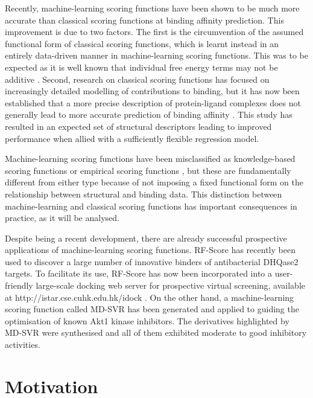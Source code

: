 Recently, machine-learning scoring functions have been shown \citep{564} to be much more accurate than classical scoring functions at binding affinity prediction. This improvement is due to two factors. The first is the circumvention of the assumed functional form of classical scoring functions, which is learnt instead in an entirely data-driven manner in machine-learning scoring functions. This was to be expected as it is well known that individual free energy terms may not be additive \citep{1471,1416}. Second, research on classical scoring functions has focused on increasingly detailed modelling of contributions to binding, but it has now been established that a more precise description of protein-ligand complexes does not generally lead to more accurate prediction of binding affinity \citep{1370}. This study has resulted in an expected set of structural descriptors leading to improved performance when allied with a sufficiently flexible regression model.

Machine-learning scoring functions have been misclassified as knowledge-based scoring functions \citep{1373,1372} or empirical scoring functions \citep{1305}, but these are fundamentally different from either type because of not imposing a fixed functional form on the relationship between structural and binding data. This distinction between machine-learning and classical scoring functions has important consequences in practice, as it will be analysed.

Despite being a recent development, there are already successful prospective applications of machine-learning scoring functions. RF-Score \citep{564} has recently been used \citep{1281} to discover a large number of innovative binders of antibacterial DHQase2 targets. To facilitate its use, RF-Score  has now been incorporated into a user-friendly large-scale docking web server for prospective virtual screening, available at http://istar.cse.cuhk.edu.hk/idock \citep{1362}. On the other hand, a machine-learning scoring function called MD-SVR has been generated and applied \citep{1452} to guiding the optimisation of known Akt1 kinase inhibitors. The derivatives highlighted by MD-SVR were synthesised and all of them exhibited moderate to good inhibitory activities.

\section{Motivation}

